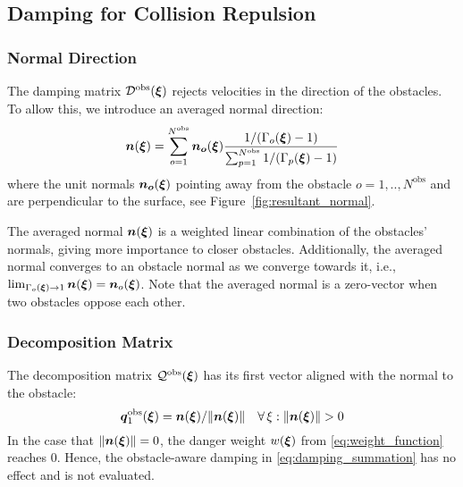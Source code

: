 \subsection{Damping for Collision Repulsion} \label{sec:obstacle_repulsion}

\subsubsection{Normal Direction}
The damping matrix $\mathcal{D}^{\mathrm{obs}}(\boldsymbol{\xi})$ rejects velocities in the direction of the obstacles. To allow this, we introduce an averaged normal direction:
\begin{equation}
  \vecs n(\vecs\xi) = \sum_{o=1}^{N^{\mathrm{obs}}} \vecs{n_o}(\vecs\xi)
  \frac{1 / (\Gamma_o(\vecs \xi) - 1)}{\sum_{p=1}^{N^\mathrm{obs}} 1 / (\Gamma_p(\vecs \xi) - 1)}
  \label{eq:averaged_normal}
\end{equation}
 where the unit normals $\boldsymbol{n_o} (\boldsymbol{\xi})$ pointing away from the obstacle $o = 1,  ..,  N^{\mathrm{obs}}$ and are perpendicular to the surface, see Figure~\ref{fig:resultant_normal}. 

The averaged normal $\boldsymbol{n}(\boldsymbol{\xi})$ is a weighted linear combination of the obstacles' normals, giving more importance to closer obstacles.
Additionally, the averaged normal converges to an obstacle normal as we converge towards it, i.e., $\lim_{\Gamma_o(\boldsymbol{\xi}) \rightarrow 1} \boldsymbol{n}(\boldsymbol{\xi}) = \boldsymbol{n}_o(\boldsymbol{\xi})$.
Note that the averaged normal is a zero-vector when two obstacles oppose each other. 

\subsubsection{Decomposition Matrix}
The decomposition matrix $\mathcal{Q}^{\mathrm{obs}}(\boldsymbol{\xi})$ has its first vector aligned with the normal to the obstacle:  
\begin{equation}
    \boldsymbol{q}_1^{\mathrm{obs}}(\boldsymbol{\xi}) =  \boldsymbol{n}(\boldsymbol{\xi}) / \lVert\boldsymbol{n}(\boldsymbol{\xi})\rVert 
    \quad \forall \, \xi : \lVert\boldsymbol{n}(\boldsymbol{\xi})\rVert  > 0
\end{equation}
In the case that $\lVert\boldsymbol{n}(\boldsymbol{\xi})\rVert = 0$, the danger weight $w(\boldsymbol{\xi})$ from \eqref{eq:weight_function} reaches 0. Hence, the obstacle-aware damping in \eqref{eq:damping_summation} has no effect and is not evaluated.

